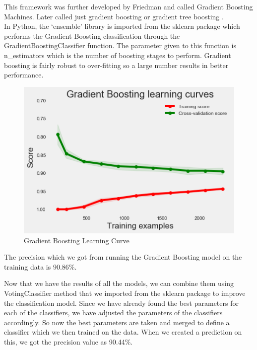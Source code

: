 This framework was further developed by Friedman and called Gradient Boosting Machines. Later called just gradient boosting or gradient tree boosting \cite{link15}.\\
In Python, the `ensemble' library is imported from the sklearn package which performs the Gradient Boosting classification through the GradientBoostingClassifier function. The parameter given to this function is n\_estimators which is the number of boosting stages to perform. Gradient boosting is fairly robust to over-fitting so a large number results in better performance.

\begin{figure}[H]
\caption{Gradient Boosting Learning Curve}
\label{5.4}
\centering
\includegraphics[width=\columnwidth]{images/5_4.png}
\end{figure}

The precision which we got from running the Gradient Boosting model on the training data is 90.86\%.

Now that we have the results of all the models, we can combine them using VotingClassifier method that we imported from the sklearn package to improve the classification model. Since we have already found the best parameters for each of the classifiers, we have adjusted the parameters of the classifiers accordingly. So now the best parameters are taken and merged to define a classifier which  we then trained on the data. When we created a prediction on this, we got the precision value as 90.44\%.

